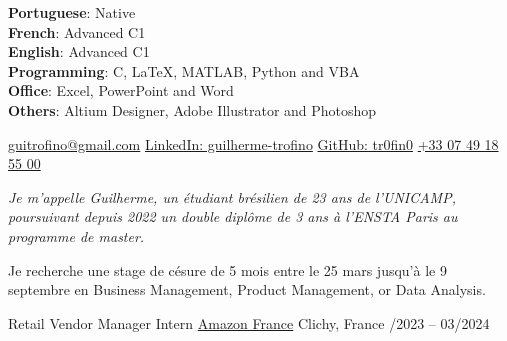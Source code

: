 \documentclass[10pt, a4paper]{extarticle}
\newcommand{\areaofinterest}{Business Management, Product Management, or Data Analysis}
\begin{document}
\vspace{6mm}
\begin{multicols}{2}
    \vspace{2mm}
    \textbf{Portuguese}: Native\\
    \textbf{French}: Advanced C1\\
    \textbf{English}: Advanced C1\\
    \columnbreak
    \vspace{2mm}
    \textbf{Programming}: C, LaTeX, MATLAB, Python and VBA\\
    \textbf{Office}: Excel, PowerPoint and Word\\
    \textbf{Others}: Altium Designer, Adobe Illustrator and Photoshop\\
\end{multicols}



\newpage
{}

\noindent\href{mailto:guitrofino@gmail.com}{guitrofino@gmail.com}
\qquad\href{https://www.linkedin.com/in/guilherme-trofino/}{LinkedIn: guilherme-trofino}
\qquad\href{https://github.com/tr0fin0}{GitHub: tr0fin0}
\qquad\href{tel:+330749185500}{+33 07 49 18 55 00}


\begin{multicols}{2}
\noindent \textit{Je m'appelle Guilherme, un étudiant brésilien de 23 ans de l'UNICAMP, poursuivant depuis 2022 un double diplôme de 3 ans à l'ENSTA Paris au programme de master.}

\columnbreak

\noindent Je recherche une stage de césure de 5 mois entre le 25 mars jusqu'à le 9 septembre en \areaofinterest.
\end{multicols}


\headedsection
    {Retail Vendor Manager Intern}
    {}
    {
        \headedsubsection
        {\href{https://www.aboutamazon.fr/}{Amazon France}}
        {Clichy, France /2023 -- 03/2024}
        {}
    }
\end{document}
